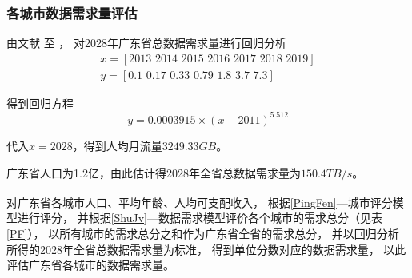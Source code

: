 \documentclass[UTF8,12pt]{ctexart}
\newcommand{\upcite}[1]{\textsuperscript{\cite{#1}}}
\begin{document}
        \subsubsection[网络需求评估]{各城市数据需求量评估}\label{WLXQPG}
            由文献\cite{yjJJ} 至 \cite{ysJJ}，
            对2028年广东省总数据需求量进行回归分析
            \begin{gather*}
                x=[2013\,\, 2014\,\, 2015\,\, 2016\,\, 2017\,\, 2018\,\, 2019]\\
                y=[0.1\,\, 0.17\,\, 0.33\,\, 0.79\,\, 1.8\,\, 3.7\,\, 7.3]
            \end{gather*}\par
            得到回归方程$$y=0.0003915×(x-2011)^{5.512}$$\par
            代入$x=2028$，得到人均月流量$3249.33GB$。\par
            广东省人口为1.2亿，由此估计得2028年全省总数据需求量为$150.4TB/s$。\par
            对广东省各城市人口、平均年龄、人均可支配收入\upcite{CSSJ}，
            根据\ref{PingFen}—城市评分模型进行评分，
            并根据\ref{ShuJv}—数据需求模型评价各个城市的需求总分（见表\ref{PF}），
            以所有城市的需求总分之和作为广东省全省的需求总分，
            并以回归分析所得的2028年全省总数据需求量为标准，
            得到单位分数对应的数据需求量，
            以此评估广东省各城市的数据需求量。
\end{document}
